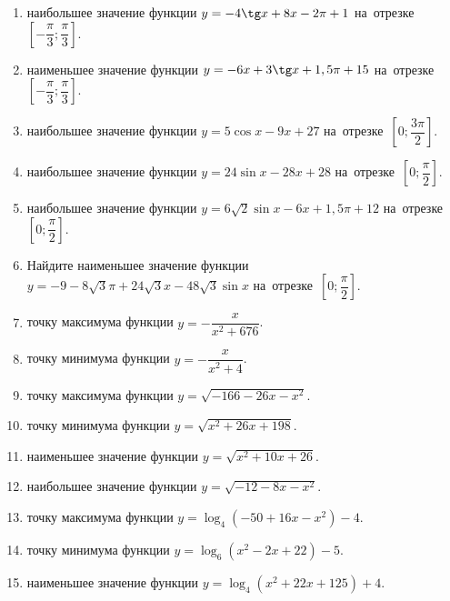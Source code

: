 \documentclass[a4paper,10pt]{article}
\begin{document}
\begin{enumerate}
\item {} наибольшее значение функции $y=-4\tg x +8x-2\pi +1$ на~отрезке~$\left[-\dfrac{\pi}{3};\dfrac{\pi}{3}\right]$.

\item {} наименьшее значение функции $y=-6x +3\tg x+1,5\pi+15$ на~отрезке~$\left[-\dfrac{\pi}{3};\dfrac{\pi}{3}\right]$.

\item {} наибольшее значение функции $y=5\cos x-9x+27$ на~отрезке~$\left[0;\dfrac{3\pi}{2}\right]$.

\item {} наибольшее значение функции $y=24\sin x-28x+28$ на~отрезке~$\left[0;\dfrac{\pi}{2}\right]$.

\item {} наибольшее значение функции $y=6\sqrt{2}\sin x-6x+1,5\pi +12$ на~отрезке~$\left[0;\dfrac{\pi}{2}\right]$.

\item Найдите наименьшее значение функции $y=-9-8\sqrt{3}\pi+24\sqrt{3}x-48\sqrt{3}\sin x$ на~отрезке~$\left[0;\dfrac{\pi}{2}\right]$.

\item {} точку максимума функции $y=-\dfrac{x}{ x^2 +676}$.

\item {} точку минимума функции $y=-\dfrac{x}{ x^2 +4}$.

\item {} точку максимума функции $y=\sqrt{-166-26x-x^2}$.

\item {} точку минимума функции $y=\sqrt{x^2+26x+198}$.

\item {} наименьшее значение функции $y=\sqrt{x^2+10x+26}$.

\item {} наибольшее значение функции $y=\sqrt{-12-8x-x^2}$.

\item {} точку максимума функции $y=\log_4\left(-50+16x-x^2\right)-4$.

\item {} точку минимума функции $y=\log_6\left(x^2-2x+22\right)-5$.

\item {} наименьшее значение функции $y=\log_4\left(x^2+22x+125\right)+4$.


\end{enumerate}
\end{document}
